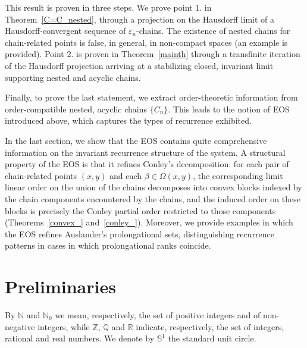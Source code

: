 \documentclass[10pt,a4paper]{article}
\theoremstyle{definition}
\theoremstyle{remark}
\theoremstyle{plain}
\begin{document}
This result is proven in three steps. We prove point 1. in Theorem~\ref{C=C_nested}, through a projection on the Hausdorff limit of a Hausdorff-convergent sequence of $\varepsilon_n$-chains. The existence of nested chains for chain-related points is false, in general, in non-compact spaces (an example is provided). Point 2. is proven in Theorem~\ref{mainth} through a transfinite iteration of the Hausdorff projection arriving at a stabilizing closed, invariant limit supporting nested and acyclic chains. 

Finally, to prove the last statement, we extract order-theoretic information from  order-compatible nested, acyclic chains $\{C_n\}$. This leads to the notion of EOS introduced above, which captures the types of recurrence exhibited. 

\noindent In the last section, we show that the EOS contains quite comprehensive
information on the invariant recurrence structure of the system.
A structural property of the EOS is that it refines Conley’s
decomposition: for each pair of chain-related points $(x,y)$ and each
$\beta\in\Omega(x,y)$, the corresponding limit linear order on the union
of the chains decomposes into convex blocks indexed by the chain components
encountered by the chains, and the induced order on these blocks is precisely
the Conley partial order restricted to those components
(Theorems~\ref{convex_} and~\ref{conley_}). Moreover, we provide examples
in which the EOS refines Auslander's prolongational sets, distinguishing
recurrence patterns in cases in which prolongational ranks coincide.





\section{Preliminaries}
By $\mathbb{N}$ and $\mathbb N_0$ we mean, respectively, the set of positive integers and of non-negative integers,
while $\mathbb Z$, $\mathbb{Q}$ and $\mathbb R$ indicate, respectively, the set of integers, rational and real numbers. We denote by $\mathbb S^1$ the standard unit circle.
\end{document}
